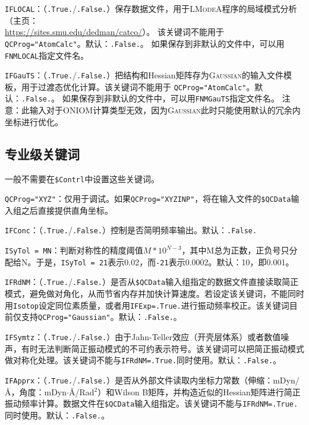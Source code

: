 \documentclass[12pt,a4paper,openany,twoside,cap,UTF8]{ctexbook}
\begin{document}
\bigskip{}\noindent
\verb|IFLOCAL|：（\verb|.True.|/\verb|.False.|）保存数据文件，用于\textsc{LModeA}程序的局域模式分析（主页：\\
\href{https://sites.smu.edu/dedman/catco/}{https://sites.smu.edu/dedman/catco/}）。
该关键词不能用于\verb|QCProg="AtomCalc"|。默认：\verb|.False.|。
如果保存到非默认的文件中，可以用\verb|FNMLOCAL|指定文件名。

\bigskip{}\noindent
\verb|IFGauTS|：（\verb|.True.|/\verb|.False.|）把结构和Hessian矩阵存为\textsc{Gaussian}的输入文件模板，用于过渡态优化计算。该关键词不能用于
\verb|QCProg="AtomCalc"|。默认：\verb|.False.|。
如果保存到非默认的文件中，可以用\verb|FNMGauTS|指定文件名。
注意：此输入对于ONIOM计算类型无效，因为\textsc{Gaussian}此时只能使用默认的冗余内坐标进行优化。

\subsection{专业级关键词} \label{subsec:inp-qcdata-expert}

一般不需要在\texttt{\$Contrl}中设置这些关键词。

\bigskip{}\noindent
\verb|QCProg="XYZ"|：仅用于调试。如果\verb|QCProg="XYZINP"|，将在输入文件的\texttt{\$QCData}输入组之后直接提供直角坐标。

\bigskip{}\noindent
\verb|IFConc|：（\verb|.True.|/\verb|.False.|）控制是否简明频率输出。默认：\verb|.False.|

\bigskip{}\noindent
\verb|ISyTol = MN|：判断对称性的精度阈值$M*10^{N-3}$，其中M总为正数，正负号只分配给N。于是，\verb|ISyTol = 21|表示0.02，而\verb|-21|表示0.0002。默认：10，即0.001。

\bigskip{}\noindent
\verb|IFRdNM|：（\verb|.True.|/\verb|.False.|）是否从\texttt{\$QCData}输入组指定的数据文件直接读取简正模式，避免做对角化，从而节省内存并加快计算速度。若设定该关键词，不能同时用\verb|Isotop|设定同位素质量，或者用\verb|IFExp=.True.|进行振动频率校正。该关键词目前仅支持\verb|QCProg="Gaussian"|。默认：\verb|.False.|。

\bigskip{}\noindent
\verb|IFSymtz|：（\verb|.True.|/\verb|.False.|）由于Jahn-Teller效应（开壳层体系）或者数值噪声，有时无法判断简正振动模式的不可约表示符号。该关键词可以把简正振动模式做对称化处理。该关键词不能与\verb|IFRdNM=.True.|同时使用。默认：\verb|.False.|。

\bigskip{}\noindent
\verb|IFApprx|：（\verb|.True.|/\verb|.False.|）是否从外部文件读取内坐标力常数（伸缩：mDyn/\AA，角度：mDyn$\cdot$\AA/Rad$^2$）和Wilson B矩阵，并构造近似的Hessian矩阵进行简正振动频率计算。数据文件在\texttt{\$QCData}输入组指定。该关键词不能与\verb|IFRdNM=.True.|同时使用。默认：\verb|.False.|。
\end{document}
